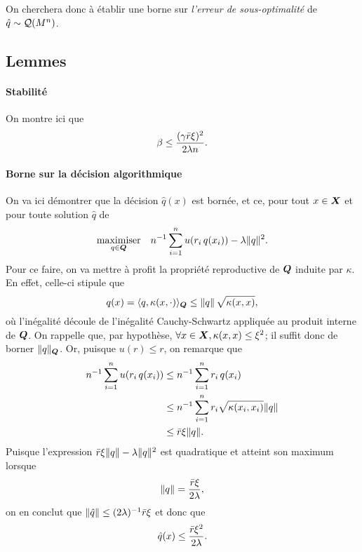 On cherchera donc à établir une borne sur \textit{l'erreur de sous-optimalité} de
$\hat q \sim \mathcal{Q}(M^n)$.




\subsection{Lemmes}

\paragraph{Stabilité}

On montre ici que
\begin{equation}
  \beta \leq \frac{(\gamma\bar r\xi)^2}{2\lambda n}.
\end{equation}

\paragraph{Borne sur la décision algorithmique}

On va ici démontrer que la décision $\hat q(x)$ est bornée, et ce, pour tout $x \in \bm{X}$ et
pour toute solution $\hat q$ de
\begin{equation}
  \label{b:l1}
  \maximizeEquation[q \in \Q]{n^{-1}\sumi u(r_i\,q(x_i)) - \lambda\nq{q}^2.}
\end{equation}
Pour ce faire, on va mettre à profit la propriété reproductive de $\bm Q$ induite par $\kappa$. En
effet, celle-ci stipule que
\begin{equation}
  q(x) = \langle q, \kappa(x,\cdot)\rangle_{\bm Q} \leq\|q\|\,\sqrt{\kappa(x,x)},
\end{equation}
où l'inégalité découle de l'inégalité Cauchy-Schwartz appliquée au produit interne de
$\bm Q$.  On rappelle que, par hypothèse, $\forall x\in\bm{X}, \kappa(x,x) \leq \xi^2$; il suffit donc de borner
$\|q\|_{\bm Q}$. Or, puisque $u(r) \leq r$, on remarque que
\begin{align}
  n^{-1}\sum_{i=1}^n u(r_i\,q(x_i)) &\leq n^{-1}\sum_{i=1}^n r_i\,q(x_i)\\
                             & \leq n^{-1}\sum_{i=1}^n r_i\sqrt{\kappa(x_i,x_i)}\|q\|\\
                             & \leq \bar r \xi \|q\|.
\end{align}
Puisque l'expression $\bar r \xi \|q\| - \lambda\|q\|^2$ est quadratique et atteint son maximum
lorsque
\begin{equation}
  \|q\| = \frac{\bar r \xi}{2\lambda},
\end{equation}
on en conclut que $\|\hat q\| \leq (2\lambda)^{-1}\bar r\xi$ et donc que
\begin{equation}
  \hat q(x) \leq \frac{\bar r\xi^2}{2\lambda}.
\end{equation}


